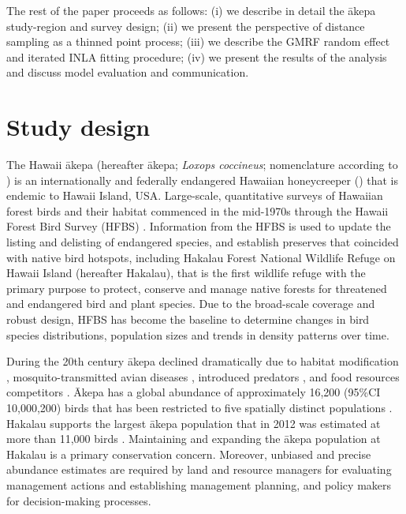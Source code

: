 \documentclass[preprint,12pt]{elsarticle}
\newcommand{\akepa}{\textquotesingle\={a}kepa}  %
\newcommand{\Akepa}{\textquotesingle\={A}kepa}  %
\newcommand{\hawaii}{Hawai\textquotesingle i}   %
\begin{document}
The rest of the paper proceeds as follows:  (i) we describe in detail the \akepa{} study-region and survey design; (ii) we present the perspective of distance sampling as a thinned point process; (iii) we describe the GMRF random effect and iterated INLA fitting procedure; (iv) we present the results of the analysis and discuss model evaluation and communication.


\section{Study design}

The \hawaii{} \akepa{} (hereafter \akepa{}; \textit{Loxops coccineus}; nomenclature according to \citealp{usfws_akepa_1970}) is an internationally and federally endangered Hawaiian honeycreeper (\citealp{usfws_akepa_1970, birdlife_akepa_2016}) that is endemic to \hawaii{} Island, USA.  Large-scale, quantitative surveys of Hawaiian forest birds and their habitat commenced in the mid-1970s through the Hawaii Forest Bird Survey (HFBS) \citep{scott_HFBS_1986}. Information from the HFBS is used to update the listing and delisting of endangered species, and establish preserves that coincided with native bird hotspots, including Hakalau Forest National Wildlife Refuge on \hawaii{} Island (hereafter Hakalau), that is the first wildlife refuge with the primary purpose to protect, conserve and manage native forests for threatened and endangered bird and plant species. Due to the broad-scale coverage and robust design, HFBS has become the baseline to determine changes in bird species distributions, population sizes and trends in density patterns over time.

During the 20th century \akepa{} declined dramatically due to habitat modification \citep{scott_HFBS_1986, pratt_avifaunal_1994},  mosquito-transmitted avian diseases \citep{pratt_avifaunal_1994, atkinson_wildlife_1995}, introduced predators \citep{lepson_akepa_1997}, and food resources competitors \citep{lepson_akepa_1997}. \Akepa{} has a global abundance of approximately 16,200 (95\%CI 10,000,200) birds that has been restricted to five spatially distinct populations \citep{judge_akepa_2018}. Hakalau supports the largest \akepa{} population that in 2012 was estimated at more than 11,000 birds \citep{camp_statespace_2016}. Maintaining and expanding the \akepa{} population at Hakalau is a primary conservation concern. Moreover, unbiased and precise abundance estimates are required by land and resource managers for evaluating management actions and establishing management planning, and policy makers for decision-making processes.
\end{document}
